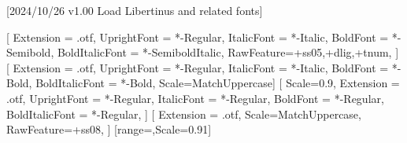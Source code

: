 
[2024/10/26 v1.00 Load Libertinus and related fonts]

%
%
\ifpdftex
    \RequirePackage[T1]{fontenc}
    \RequirePackage[lf,t,semibold,ScaleTT=0.9]{libertinus} %
    \RequirePackage{bm}%
\else
    \RequirePackage[warnings-off={mathtools-colon,mathtools-overbracket}]{unicode-math}
    \setmainfont{LibertinusSerif}[%
    	Extension = .otf,
    	UprightFont = *-Regular,
    	ItalicFont = *-Italic,
    	BoldFont = *-Semibold, 
    	BoldItalicFont = *-SemiboldItalic,
    	RawFeature={+ss05,+dlig,+tnum}, 
        ]    
    \setsansfont{LibertinusSans}[%
    	Extension = .otf,
    	UprightFont = *-Regular,
    	ItalicFont = *-Italic,
    	BoldFont = *-Bold,
	    BoldItalicFont = *-Bold,%
    	Scale=MatchUppercase]
    \setmonofont{LibertinusMono}[%
    	Scale=0.9,%
	    Extension = .otf,
    	UprightFont = *-Regular,
    	ItalicFont = *-Regular,%
    	BoldFont = *-Regular,%
	    BoldItalicFont = *-Regular,%
	] 
	\newfontfamily{}%
	\newfontfamily{}%
    [%
     	Extension = .otf,   
    	Scale=MatchUppercase,
    	RawFeature={+ss08},%
    	]
	[range=\nabla,Scale=0.91] %
	
    \newcommand*{\FRAC}[1]{{\addfontfeature{Fractions=On}#1}}%
\fi
